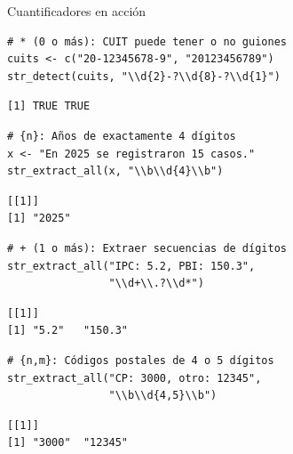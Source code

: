\documentclass[8pt]{beamer}
\begin{document}
\begin{frame}[fragile]{Cuantificadores en acción}
\begin{lstlisting}[style=RScript]
# * (0 o más): CUIT puede tener o no guiones
cuits <- c("20-12345678-9", "20123456789")
str_detect(cuits, "\\d{2}-?\\d{8}-?\\d{1}")
\end{lstlisting}
\begin{lstlisting}[style=RConsole]
[1] TRUE TRUE
\end{lstlisting}
\begin{lstlisting}[style=RScript]
# {n}: Años de exactamente 4 dígitos
x <- "En 2025 se registraron 15 casos."
str_extract_all(x, "\\b\\d{4}\\b")
\end{lstlisting}
\begin{lstlisting}[style=RConsole]
[[1]]
[1] "2025"
\end{lstlisting}
\begin{lstlisting}[style=RScript]
# + (1 o más): Extraer secuencias de dígitos
str_extract_all("IPC: 5.2, PBI: 150.3",
                "\\d+\\.?\\d*")
\end{lstlisting}
\begin{lstlisting}[style=RConsole]
[[1]]
[1] "5.2"   "150.3"
\end{lstlisting}
\begin{lstlisting}[style=RScript]
# {n,m}: Códigos postales de 4 o 5 dígitos
str_extract_all("CP: 3000, otro: 12345",
                "\\b\\d{4,5}\\b")
\end{lstlisting}
\begin{lstlisting}[style=RConsole]
[[1]]
[1] "3000"  "12345"
\end{lstlisting}
\end{frame}
\end{document}
